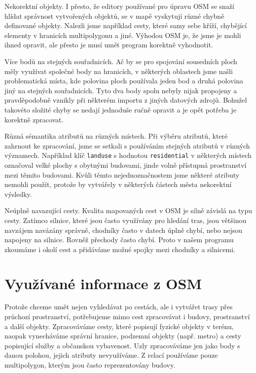 Nekorektní objekty. I přesto, že editory používané pro úpravu OSM se snaží
hlídat správnost vytvořených objektů, se v mapě vyskytují různé chybně
definované objekty. Nalezli jsme například cesty, které samy sebe kříží,
chybějící elementy v hranicích multipolygonu a jiné. Výhodou OSM je, že jsme je
mohli ihned opravit, ale přesto je musí umět program korektně vyhodnotit.

Více bodů na stejných souřadnicích. Ač by se pro spojování sousedních ploch měly
využívat společné body na hranicích, v některých oblastech jsme našli
problematická místa, kde polovina ploch používala jeden bod a druhá polovina
jiný na stejných souřadnicích. Tyto dva body spolu nebyly nijak propojeny a
pravděpodobně vznikly při některém importu z jiných datových zdrojů. Bohužel
takovéto složité chyby se nedají jednoduše ručně opravit a je opět potřeba je
korektně zpracovat.

Různá sémantika atributů na různých místech. Při výběru atributů, které zahrnout
ke zpracování, jsme se setkali s používáním stejných atributů v různých
významech. Například klíč \verb|landuse| s hodnotou \verb|residential| v
některých místech označoval velké plochy s obytnými budovami, jinde volně
přístupná prostranství mezi těmito budovami. Kvůli těmto nejednoznačnostem jsme
některé atributy nemohli použít, protože by vytvářely v některých částech města
nekorektní výsledky.

Neúplně navazující cesty. Kvalita mapovaných cest v OSM je silně závislá na typu
cesty. Zatímco silnice, které jsou často využívány pro hledání tras, jsou
většinou navzájem navázány správně, chodníky často v datech úplně chybí, nebo
nejsou napojeny na silnice. Rovněž přechody často chybí. Proto v našem programu
zkoumáme i okolí cest a přidáváme možné spojky mezi chodníky a silnicemi.

\section{Využívané informace z OSM}
Protože chceme umět nejen vyhledávat po cestách, ale i vytvářet trasy přes
průchozí prostranství, potřebujeme mimo cest zpracovávat i budovy, prostranství 
a další objekty. Zpracováváme cesty, které popisují fyzické objekty v terénu,
naopak vynecháváme správní hranice, podzemní objekty (např. metro) a cesty
popisující služby a občanskou vybavenost. Uzly zpracováváme jen jako body s
danou polohou, jejich atributy nevyužíváme. Z relací používáme pouze
multipolygon, kterým jsou často reprezentovány budovy.

